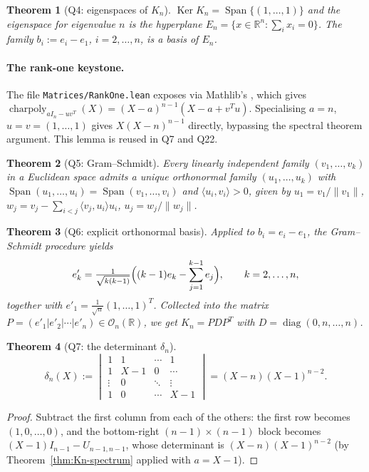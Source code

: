 \documentclass[11pt,a4paper]{article}
\newcommand{\lmod}[1]{\texttt{\small #1}}
\newcommand{\R}{\mathbb{R}}
\newcommand{\Span}{\operatorname{Span}}
\newcommand{\charpoly}{\operatorname{charpoly}}
\newcommand{\Ker}{\operatorname{Ker}}
\theoremstyle{plain}
\newtheorem{theorem}{Theorem}[section]
\theoremstyle{definition}
\begin{document}
\begin{theorem}[Q4: eigenspaces of $K_n$]
$\Ker K_n = \Span\{(1,\ldots,1)\}$ and the eigenspace for eigenvalue
$n$ is the hyperplane $E_n = \{x \in \R^n : \sum_i x_i = 0\}$. The
family $b_i := e_i - e_1$, $i = 2, \ldots, n$, is a basis of $E_n$.
\end{theorem}

\paragraph{The rank-one keystone.}
The file \lmod{Matrices/RankOne.lean} exposes
 via Mathlib's
, which gives
$\charpoly_{a I_n - u v^T}(X) = (X-a)^{n-1}(X - a + v^Tu)$. Specialising
$a = n$, $u = v = (1,\ldots,1)$ gives $X(X-n)^{n-1}$ directly, bypassing
the spectral theorem argument. This lemma is reused in Q7 and Q22.

\begin{theorem}[Q5: Gram--Schmidt] Every linearly independent family
$(v_1, \ldots, v_k)$ in a Euclidean space admits a unique orthonormal
family $(u_1, \ldots, u_k)$ with $\Span(u_1, \ldots, u_i) =
\Span(v_1, \ldots, v_i)$ and $\langle u_i, v_i\rangle > 0$, given by
$u_1 = v_1 / \|v_1\|$, $w_j = v_j - \sum_{i<j}\langle v_j, u_i\rangle u_i$,
$u_j = w_j / \|w_j\|$.\end{theorem}

\begin{theorem}[Q6: explicit orthonormal basis]
Applied to $b_i = e_i - e_1$, the Gram--Schmidt procedure yields
\[ e'_k = \tfrac{1}{\sqrt{k(k-1)}}\Bigl((k-1)e_k - \sum_{j=1}^{k-1} e_j\Bigr),
   \qquad k = 2, \ldots, n, \]
together with $e'_1 = \tfrac{1}{\sqrt n}(1, \ldots, 1)^T$. Collected
into the matrix $P = (e'_1 | e'_2 | \cdots | e'_n) \in \mathcal O_n(\R)$,
we get $K_n = P D P^T$ with $D = \operatorname{diag}(0, n, \ldots, n)$.
\end{theorem}

\begin{theorem}[Q7: the determinant $\delta_n$]
\[
\delta_n(X) :=
\begin{vmatrix}
1 & 1 & \cdots & 1 \\
1 & X - 1 & 0 & \cdots \\
\vdots & 0 & \ddots & \vdots \\
1 & 0 & \cdots & X-1
\end{vmatrix}
= (X - n)(X-1)^{n-2}.
\]
\end{theorem}

\begin{proof}
Subtract the first column from each of the others: the first row becomes
$(1, 0, \ldots, 0)$, and the bottom-right $(n-1)\times(n-1)$ block becomes
$(X-1)I_{n-1} - U_{n-1,n-1}$, whose determinant is $(X-n)(X-1)^{n-2}$
(by Theorem~\ref{thm:Kn-spectrum} applied with $a = X - 1$).
\end{proof}
\end{document}
